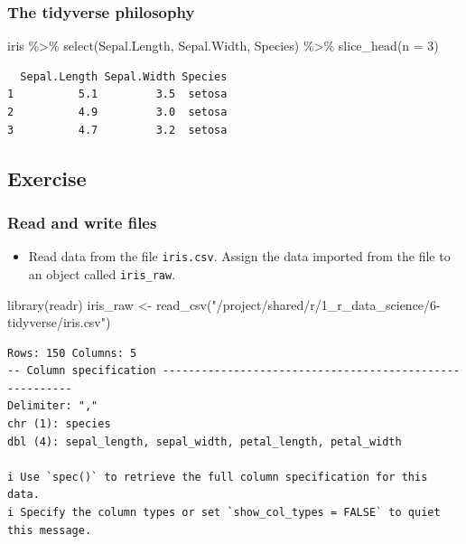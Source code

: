 \documentclass[
  letterpaper,
  DIV=11,
  numbers=noendperiod]{scrartcl}
\newenvironment{Shaded}{\begin{snugshade}}{\end{snugshade}}
\newcommand{\AttributeTok}[1]{\textcolor[rgb]{0.40,0.45,0.13}{#1}}
\newcommand{\DecValTok}[1]{\textcolor[rgb]{0.68,0.00,0.00}{#1}}
\newcommand{\FunctionTok}[1]{\textcolor[rgb]{0.28,0.35,0.67}{#1}}
\newcommand{\NormalTok}[1]{\textcolor[rgb]{0.00,0.23,0.31}{#1}}
\newcommand{\OtherTok}[1]{\textcolor[rgb]{0.00,0.23,0.31}{#1}}
\newcommand{\SpecialCharTok}[1]{\textcolor[rgb]{0.37,0.37,0.37}{#1}}
\newcommand{\StringTok}[1]{\textcolor[rgb]{0.13,0.47,0.30}{#1}}
\providecommand{\tightlist}{%
  \setlength{\itemsep}{0pt}\setlength{\parskip}{0pt}}\usepackage{longtable,booktabs,array}
\begin{document}
\subsubsection{The tidyverse philosophy}\label{the-tidyverse-philosophy}

\begin{Shaded}
\begin{Highlighting}[]
\NormalTok{iris }\SpecialCharTok{\%\textgreater{}\%}
    \FunctionTok{select}\NormalTok{(Sepal.Length, Sepal.Width, Species) }\SpecialCharTok{\%\textgreater{}\%}
    \FunctionTok{slice\_head}\NormalTok{(}\AttributeTok{n =} \DecValTok{3}\NormalTok{)}
\end{Highlighting}
\end{Shaded}

\begin{verbatim}
  Sepal.Length Sepal.Width Species
1          5.1         3.5  setosa
2          4.9         3.0  setosa
3          4.7         3.2  setosa
\end{verbatim}

\subsection{Exercise}\label{exercise}

\subsubsection{Read and write files}\label{read-and-write-files}

\begin{itemize}
\tightlist
\item
  Read data from the file \texttt{iris.csv}. Assign the data imported
  from the file to an object called \texttt{iris\_raw}.
\end{itemize}

\begin{Shaded}
\begin{Highlighting}[]
\FunctionTok{library}\NormalTok{(readr)}
\NormalTok{iris\_raw }\OtherTok{\textless{}{-}} \FunctionTok{read\_csv}\NormalTok{(}\StringTok{"/project/shared/r/1\_r\_data\_science/6{-}tidyverse/iris.csv"}\NormalTok{)}
\end{Highlighting}
\end{Shaded}

\begin{verbatim}
Rows: 150 Columns: 5
-- Column specification --------------------------------------------------------
Delimiter: ","
chr (1): species
dbl (4): sepal_length, sepal_width, petal_length, petal_width

i Use `spec()` to retrieve the full column specification for this data.
i Specify the column types or set `show_col_types = FALSE` to quiet this message.
\end{verbatim}
\end{document}
